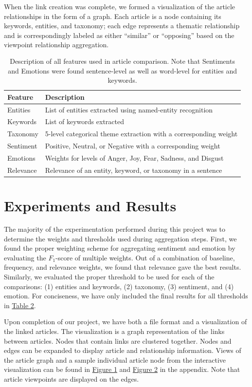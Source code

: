 \documentclass[12pt]{article}
\begin{document}
When the link creation was complete, we formed a visualization of the article relationships in the form of a graph. Each article is a node containing its keywords, entities, and taxonomy; each edge represents a thematic relationship and is correspondingly labeled as either ``similar'' or ``opposing'' based on the viewpoint relationship aggregation.

\begin{table}
	\begin{tabular}{|l|l|}\hline
		Feature & Description\\\hline
		Entities & List of entities extracted using named-entity recognition\\
		Keywords & List of keywords extracted\\
		Taxonomy & 5-level categorical theme extraction with a corresponding weight\\
		Sentiment & Positive, Neutral, or Negative with a corresponding weight\\
		Emotions & Weights for levels of Anger, Joy, Fear, Sadness, and Disgust\\
		Relevance & Relevance of an entity, keyword, or taxonomy in a sentence\\\hline
	\end{tabular}
	\caption{Description of all features used in article comparison. Note that Sentiments and Emotions were found sentence-level as well as word-level for entities and keywords.}
	\label{table:features}
\end{table}

\section{Experiments and Results}
The majority of the experimentation performed during this project was to determine the weights and thresholds used during aggregation steps. First, we found the proper weighting scheme for aggregating sentiment and emotion by evaluating the $F_1$-score of multiple weights. Out of a combination of baseline, frequency, and relevance weights, we found that relevance gave the best results. Similarly, we evaluated the proper threshold to be used for each of the comparisons: (1) entities and keywords, (2) taxonomy, (3) sentiment, and (4) emotion. For conciseness, we have only included the final results for all thresholds in \hyperref[table:thresholds]{Table 2}.

Upon completion of our project, we have both a file format and a visualization of the linked articles. The visualization is a graph representation of the links between articles. Nodes that contain links are clustered together. Nodes and edges can be expanded to display article and relationship information. Views of the article graph and a sample individual article node from the interactive visualization can be found in \hyperref[fig:graph]{Figure 1} and \hyperref[fig:graphNode]{Figure 2} in the appendix. Note that article viewpoints are displayed on the edges.
\end{document}
